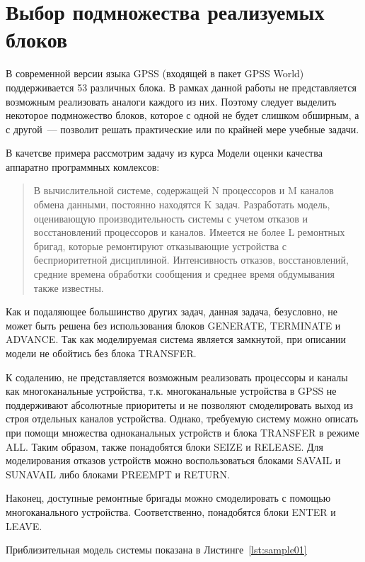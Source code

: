 \section{Выбор подмножества реализуемых блоков}

В современной версии языка GPSS (входящей в пакет GPSS World) поддерживается 53 различных блока.\cite{GPSSRef} В рамках данной работы не представляется возможным реализовать  аналоги каждого из них. Поэтому следует выделить некоторое подмножество блоков, которое с одной не будет слишком обширным, а с другой~--- позволит решать практические или по крайней мере учебные задачи.

В качетсве примера рассмотрим задачу из курса Модели оценки качества аппаратно программных комлексов:

\begin{quote}
В вычислительной системе, содержащей N процессоров и M каналов обмена данными, постоянно находятся K задач. Разработать модель, оценивающую производительность системы с учетом отказов и восстановлений процессоров и каналов. Имеется не более L ремонтных бригад, которые ремонтируют отказывающие устройства с бесприоритетной  дисциплиной. Интенсивность отказов, восстановлений, средние времена обработки сообщения и среднее время обдумывания также известны.
\end{quote}

Как и подаляющее большинство других задач, данная задача, безусловно, не может быть решена без использования блоков GENERATE, TERMINATE и ADVANCE. Так как моделируемая система является замкнутой, при описании модели не обойтись без блока TRANSFER.

К содалению, не представляется возможным реализовать процессоры и каналы как многоканальные устройства, т.к. многоканальные устройства в GPSS не поддерживают абсолютные приоритеты и не позволяют смоделировать выход из строя отдельных каналов устройства. Однако, требуемую систему можно описать при помощи множества одноканальных устройств и блока TRANSFER в режиме ALL. Таким образом, также понадобятся блоки SEIZE и RELEASE. Для моделирования отказов устройств можно воспользоваться блоками SAVAIL и SUNAVAIL либо блоками PREEMPT и RETURN.

Наконец, доступные ремонтные бригады можно смоделировать с помощью многоканального устройства. Соответственно, понадобятся блоки ENTER и LEAVE.

Приблизительная модель системы показана в Листинге~\ref{lst:sample01}



